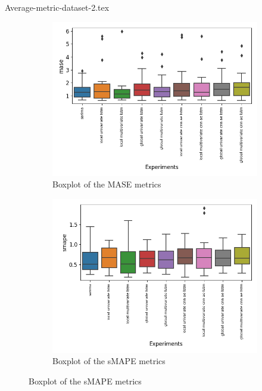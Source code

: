 \begin{samepage}
  {Average-metric-dataset-2.tex}
  \begin{figure}[ht!]
    \caption{Boxplot of predictions made on dataset 2}
    \centering
    \begin{subfigure}[b]{0.49\textwidth}
      \includegraphics[width=\textwidth]{./figs/results/boxplot/mase-dataset_2.png}
      \hfill
      \caption{Boxplot of the MASE metrics}
      \label{fig:results:boxplot-mase-dataset-2-mase}
    \end{subfigure}
    \begin{subfigure}[b]{0.49\textwidth}
      \includegraphics[width=\textwidth]{./figs/results/boxplot/smape-dataset_2.png}
      \hfill
      \caption{Boxplot of the sMAPE metrics}
      \label{fig:results:boxplot-mase-dataset-2-smape}
    \end{subfigure}
    \label{fig:results:boxplot-dataset-2}
  \end{figure}
\end{samepage}

